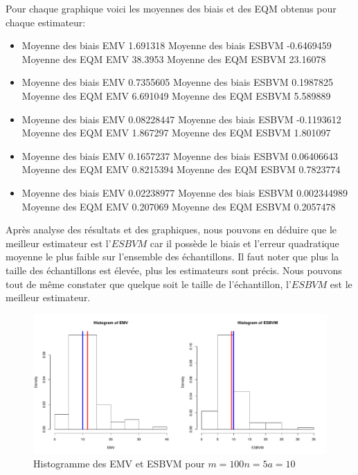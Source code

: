 \documentclass[12pt]{article}
\begin{document}
\begin{enumerate}
Pour chaque graphique voici les moyennes des biais et des EQM obtenus pour chaque estimateur:
\begin{itemize}
\item Moyenne des biais EMV 1.691318 
Moyenne des biais ESBVM -0.6469459 
Moyenne des EQM EMV 38.3953 
Moyenne des EQM ESBVM 23.16078 
\item Moyenne des biais EMV 0.7355605 
Moyenne des biais ESBVM 0.1987825 
Moyenne des EQM EMV 6.691049 
Moyenne des EQM ESBVM 5.589889 
\item Moyenne des biais EMV 0.08228447 
Moyenne des biais ESBVM -0.1193612 
Moyenne des EQM EMV 1.867297 
Moyenne des EQM ESBVM 1.801097 
\item Moyenne des biais EMV 0.1657237 
Moyenne des biais ESBVM 0.06406643 
Moyenne des EQM EMV 0.8215394 
Moyenne des EQM ESBVM 0.7823774 
\item Moyenne des biais EMV 0.02238977 
Moyenne des biais ESBVM 0.002344989 
Moyenne des EQM EMV 0.207069 
Moyenne des EQM ESBVM 0.2057478 
\\
\end{itemize}


Apr\`{e}s analyse des r\'{e}sultats et des graphiques, nous pouvons en d\'{e}duire que le meilleur estimateur est l'$ESBVM$ car il poss\`{e}de  le biais et l'erreur quadratique moyenne le plus faible sur l'ensemble des \'{e}chantillons. Il faut noter que plus la taille des \'{e}chantillons est \'{e}lev\'{e}e, plus les estimateurs sont pr\'{e}cis. Nous pouvons tout de m\^{e}me constater que quelque soit le taille de l'\'{e}chantillon, l'$ESBVM$ est le meilleur estimateur.
\begin{figure}[ht]
\label{graph1}
\centering
\includegraphics[width=1.0\textwidth]{figures/GraphP2Q31.pdf}
\caption{Histogramme des EMV et ESBVM pour $m=100 n=5 a=10$}
\end{figure}


\end{enumerate}
\end{document}
